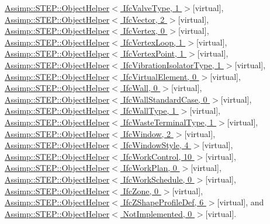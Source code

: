 \hyperlink{struct_assimp_1_1_s_t_e_p_1_1_object_helper}{Assimp\+::\+S\+T\+E\+P\+::\+Object\+Helper$<$ Ifc\+Valve\+Type, 1 $>$}{\ttfamily  \mbox{[}virtual\mbox{]}}, \hyperlink{struct_assimp_1_1_s_t_e_p_1_1_object_helper}{Assimp\+::\+S\+T\+E\+P\+::\+Object\+Helper$<$ Ifc\+Vector, 2 $>$}{\ttfamily  \mbox{[}virtual\mbox{]}}, \hyperlink{struct_assimp_1_1_s_t_e_p_1_1_object_helper}{Assimp\+::\+S\+T\+E\+P\+::\+Object\+Helper$<$ Ifc\+Vertex, 0 $>$}{\ttfamily  \mbox{[}virtual\mbox{]}}, \hyperlink{struct_assimp_1_1_s_t_e_p_1_1_object_helper}{Assimp\+::\+S\+T\+E\+P\+::\+Object\+Helper$<$ Ifc\+Vertex\+Loop, 1 $>$}{\ttfamily  \mbox{[}virtual\mbox{]}}, \hyperlink{struct_assimp_1_1_s_t_e_p_1_1_object_helper}{Assimp\+::\+S\+T\+E\+P\+::\+Object\+Helper$<$ Ifc\+Vertex\+Point, 1 $>$}{\ttfamily  \mbox{[}virtual\mbox{]}}, \hyperlink{struct_assimp_1_1_s_t_e_p_1_1_object_helper}{Assimp\+::\+S\+T\+E\+P\+::\+Object\+Helper$<$ Ifc\+Vibration\+Isolator\+Type, 1 $>$}{\ttfamily  \mbox{[}virtual\mbox{]}}, \hyperlink{struct_assimp_1_1_s_t_e_p_1_1_object_helper}{Assimp\+::\+S\+T\+E\+P\+::\+Object\+Helper$<$ Ifc\+Virtual\+Element, 0 $>$}{\ttfamily  \mbox{[}virtual\mbox{]}}, \hyperlink{struct_assimp_1_1_s_t_e_p_1_1_object_helper}{Assimp\+::\+S\+T\+E\+P\+::\+Object\+Helper$<$ Ifc\+Wall, 0 $>$}{\ttfamily  \mbox{[}virtual\mbox{]}}, \hyperlink{struct_assimp_1_1_s_t_e_p_1_1_object_helper}{Assimp\+::\+S\+T\+E\+P\+::\+Object\+Helper$<$ Ifc\+Wall\+Standard\+Case, 0 $>$}{\ttfamily  \mbox{[}virtual\mbox{]}}, \hyperlink{struct_assimp_1_1_s_t_e_p_1_1_object_helper}{Assimp\+::\+S\+T\+E\+P\+::\+Object\+Helper$<$ Ifc\+Wall\+Type, 1 $>$}{\ttfamily  \mbox{[}virtual\mbox{]}}, \hyperlink{struct_assimp_1_1_s_t_e_p_1_1_object_helper}{Assimp\+::\+S\+T\+E\+P\+::\+Object\+Helper$<$ Ifc\+Waste\+Terminal\+Type, 1 $>$}{\ttfamily  \mbox{[}virtual\mbox{]}}, \hyperlink{struct_assimp_1_1_s_t_e_p_1_1_object_helper}{Assimp\+::\+S\+T\+E\+P\+::\+Object\+Helper$<$ Ifc\+Window, 2 $>$}{\ttfamily  \mbox{[}virtual\mbox{]}}, \hyperlink{struct_assimp_1_1_s_t_e_p_1_1_object_helper}{Assimp\+::\+S\+T\+E\+P\+::\+Object\+Helper$<$ Ifc\+Window\+Style, 4 $>$}{\ttfamily  \mbox{[}virtual\mbox{]}}, \hyperlink{struct_assimp_1_1_s_t_e_p_1_1_object_helper}{Assimp\+::\+S\+T\+E\+P\+::\+Object\+Helper$<$ Ifc\+Work\+Control, 10 $>$}{\ttfamily  \mbox{[}virtual\mbox{]}}, \hyperlink{struct_assimp_1_1_s_t_e_p_1_1_object_helper}{Assimp\+::\+S\+T\+E\+P\+::\+Object\+Helper$<$ Ifc\+Work\+Plan, 0 $>$}{\ttfamily  \mbox{[}virtual\mbox{]}}, \hyperlink{struct_assimp_1_1_s_t_e_p_1_1_object_helper}{Assimp\+::\+S\+T\+E\+P\+::\+Object\+Helper$<$ Ifc\+Work\+Schedule, 0 $>$}{\ttfamily  \mbox{[}virtual\mbox{]}}, \hyperlink{struct_assimp_1_1_s_t_e_p_1_1_object_helper}{Assimp\+::\+S\+T\+E\+P\+::\+Object\+Helper$<$ Ifc\+Zone, 0 $>$}{\ttfamily  \mbox{[}virtual\mbox{]}}, \hyperlink{struct_assimp_1_1_s_t_e_p_1_1_object_helper}{Assimp\+::\+S\+T\+E\+P\+::\+Object\+Helper$<$ Ifc\+Z\+Shape\+Profile\+Def, 6 $>$}{\ttfamily  \mbox{[}virtual\mbox{]}}, and \hyperlink{struct_assimp_1_1_s_t_e_p_1_1_object_helper}{Assimp\+::\+S\+T\+E\+P\+::\+Object\+Helper$<$ Not\+Implemented, 0 $>$}{\ttfamily  \mbox{[}virtual\mbox{]}}.

